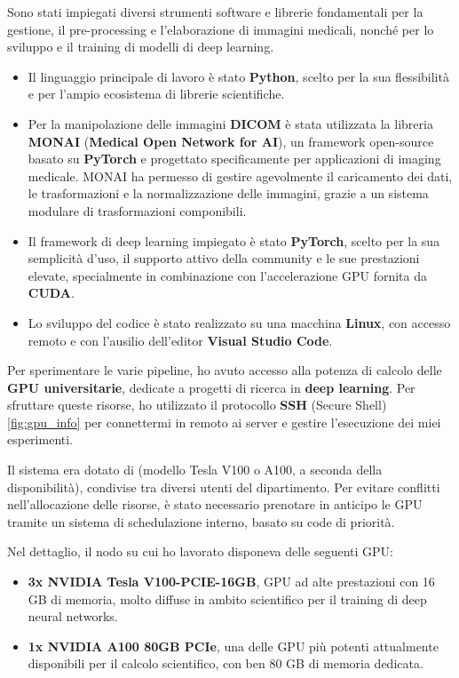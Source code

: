 	
Sono stati impiegati diversi strumenti software e librerie  fondamentali per la gestione, il pre-processing e l'elaborazione di immagini medicali, nonché per lo sviluppo e il training di modelli di deep learning.
\begin{itemize}
	\item  Il linguaggio principale di lavoro è stato \textbf{Python}, scelto per la sua flessibilità e per l'ampio ecosistema di librerie scientifiche.
	\item Per la manipolazione delle immagini \textbf{DICOM} è stata utilizzata la libreria \textbf{MONAI} (\textbf{Medical Open Network for AI}), un framework open-source basato su \textbf{PyTorch} e progettato specificamente per applicazioni di imaging medicale. MONAI ha permesso di gestire agevolmente il caricamento dei dati, le trasformazioni e la normalizzazione delle immagini, grazie a un sistema modulare di trasformazioni componibili.
	\item Il framework di deep learning impiegato è stato \textbf{PyTorch}, scelto per la sua semplicità d'uso, il supporto attivo della community e le sue prestazioni elevate, specialmente in combinazione con l'accelerazione GPU fornita da \textbf{CUDA}.
	\item Lo sviluppo del codice è stato realizzato su una macchina \textbf{Linux}, con accesso remoto e con l'ausilio dell'editor \textbf{Visual Studio Code}.
\end{itemize}


Per sperimentare le varie pipeline, ho avuto accesso alla potenza di calcolo delle \textbf{GPU universitarie}, dedicate a progetti di ricerca in \textbf{deep learning}. Per sfruttare queste risorse, ho utilizzato il protocollo \textbf{SSH} (Secure Shell) \ref{fig:gpu_info} per connettermi in remoto ai server e gestire l’esecuzione dei miei esperimenti.

Il sistema era dotato di  (modello Tesla V100 o A100, a seconda della disponibilità), condivise tra diversi utenti del dipartimento. Per evitare conflitti nell’allocazione delle risorse, è stato necessario prenotare in anticipo le GPU tramite un sistema di schedulazione interno, basato su code di priorità.

Nel dettaglio, il nodo su cui ho lavorato disponeva delle seguenti GPU:
\begin{itemize}
\item \textbf{3x NVIDIA Tesla V100-PCIE-16GB}, GPU ad alte prestazioni con 16 GB di memoria, molto diffuse in ambito scientifico per il training di deep neural networks.
\item \textbf{1x NVIDIA A100 80GB PCIe}, una delle GPU più potenti attualmente disponibili per il calcolo scientifico, con ben 80 GB di memoria dedicata. 
\end{itemize}

